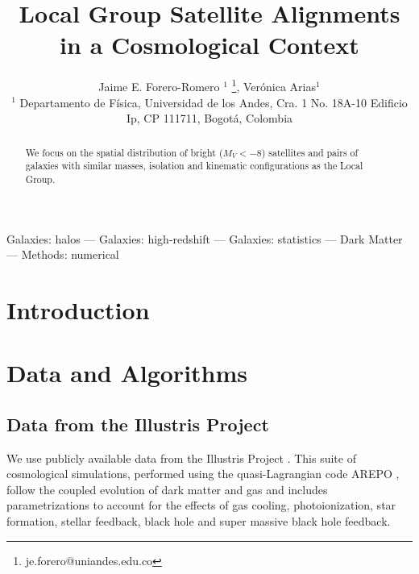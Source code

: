 \documentclass[useAMS,usenatbib,usegraphicx]{mn2e}
\begin{document}
\title[LG satellite alignments]{
Local Group Satellite Alignments in a Cosmological Context}
\author[J.E. Forero-Romero \& V. Arias]
{Jaime E. Forero-Romero $^{1}$ \thanks{je.forero@uniandes.edu.co},
Ver\'onica Arias$^1$\\
$^1$ Departamento de F\'isica, Universidad de los Andes, Cra. 1
  No. 18A-10 Edificio Ip, CP 111711, Bogot\'a, Colombia \\
}

\maketitle

\begin{abstract}
We focus on the spatial distribution of bright ($M_V<-8$) satellites and
pairs of galaxies with similar masses, isolation and kinematic
configurations as the Local Group. 
\end{abstract}

\begin{keywords}Galaxies: halos --- Galaxies: high-redshift --- Galaxies: statistics
--- Dark Matter --- Methods: numerical 
\end{keywords}

\section{Introduction}

\section{Data and Algorithms}
\label{sec:NumericalSetup}

\subsection{Data from the Illustris Project}

We use publicly available data from the Illustris Project 
\citep{2014MNRAS.444.1518V}. 
This suite of cosmological simulations, performed using the quasi-Lagrangian
code AREPO \citep{2010MNRAS.401..791S}, follow the coupled evolution of dark 
matter and gas and includes parametrizations to account for the effects of
gas cooling, photoionization, star formation, stellar feedback, black
hole and super massive black hole feedback. 
\end{document}

